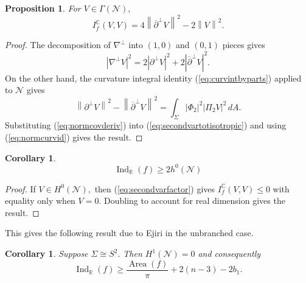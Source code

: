 \documentclass[11pt]{article}
\newtheorem{prop}[theorem]{Proposition}
\newtheorem{cor}[theorem]{Corollary}
\theoremstyle{definition}
\newcommand{\R}{\mathbb{R}}
\newcommand{\C}{\mathbb{C}}
\newcommand{\del}{\partial}
\newcommand{\delbar}{\overline{\partial}}
\numberwithin{equation}{section}
\begin{document}
\begin{prop}\label{prop:secondvasrfactor}
	For $V \in \Gamma(\mathcal{N}),$
	\begin{equation}\label{eq:secondvarfactor}
		I^\C_f(V,V) = 4 \left\lVert \delbar^{\perp} V \right\rVert^2 - 2 \left\lVert V \right\rVert^2. 
	\end{equation}
\end{prop}

\begin{proof}
	The decomposition of $\nabla^{\perp}$ into $(1,0)$ and $(0,1)$ pieces gives
	\begin{equation}\label{eq:normcovderiv}
		\left\lvert \nabla^{\perp} V \right\rvert^2 = 2 \left\lvert \del^{\perp} V \right\rvert^2 + 2 \left\lvert \delbar^{\perp} V \right\rvert^2.
	\end{equation}
	On the other hand, the curvature integral identity (\ref{eq:curvintbyparts}) applied to $\mathcal{N}$ gives
	\begin{equation}\label{eq:normcurvid}
		\left\lVert \del^{\perp} V \right\rVert^2 - \left\lVert \delbar^{\perp} V \right\rVert^2 = \int_{\Sigma} \left\lvert \Phi_2 \right\rvert^2 \left\lvert \Pi_2 V \right\rvert^2 \, dA.
	\end{equation}
	Substituting (\ref{eq:normcovderiv}) into (\ref{eq:secondvartotisotropic}) and using (\ref{eq:normcurvid}) gives the result.
\end{proof}

\begin{cor}
	{}
	\begin{equation*}
		\operatorname{Ind}_\R (f) \geq 2 h^0(\mathcal{N})
	\end{equation*}
\end{cor}

\begin{proof}
	If $V \in H^0(\mathcal{N}),$ then (\ref{eq:secondvarfactor}) gives $I^\C_f(V,V) \leq 0$ with equality only when $V = 0.$ Doubling to account for real dimension gives the result.
\end{proof}

This gives the following result due to Ejiri \cite{Ejiri83} in the unbranched case.

\begin{cor}\label{cor:Ejiribound}
	Suppose $\Sigma \cong S^2.$ Then $H^1(\mathcal{N}) = 0$ and consequently
	\begin{equation*}
		\operatorname{Ind}_\R (f) \geq \frac{\operatorname{Area}(f)}{\pi} + 2(n-3) - 2b_1.
	\end{equation*}
\end{cor}
\end{document}
